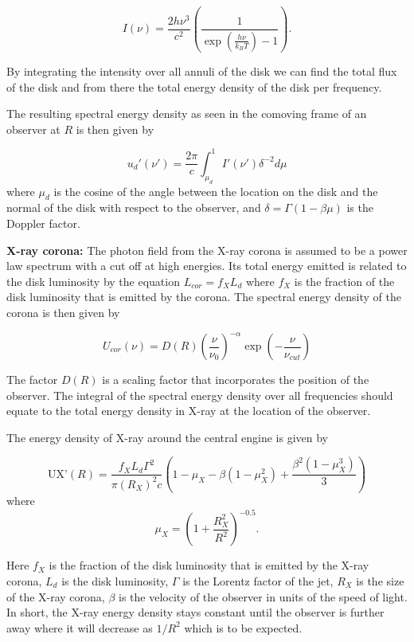 \begin{equation}
    \label{eq:BB}
    I(\nu) = \frac{2 h \nu^3}{c^2} \left(\frac{1}{\exp\left(\frac{h \nu}{k_B T}\right) - 1}\right).
\end{equation}

By integrating the intensity over all annuli of the disk we can find the total flux of the disk and from there the total energy density of the disk per frequency.

The resulting spectral energy density as seen in the comoving frame of an observer at $R$ is then given by

\begin{equation}
    u_d'(\nu') = \frac{2\pi}{c} \int_{\mu_d}^1 I'(\nu')\delta^{-2} d\mu
\end{equation}
where $\mu_d$ is the cosine of the angle between the location on the disk and the normal of the disk with respect to the observer, and $\delta = \Gamma(1-\beta \mu)$ is the Doppler factor. 

\textbf{X-ray corona:} The photon field from the X-ray corona is assumed to be a power law spectrum with a cut off at high energies. Its total energy emitted is related to the disk luminosity 
by the equation $L_{cor} = f_X L_d$ where $f_X$ is the fraction of the disk luminosity that is emitted by the corona. The spectral energy density of the corona is then given by 

\begin{equation}
    U_{cor}(\nu) = D(R)\left(\frac{\nu}{\nu_0}\right)^{-\alpha} \exp\left(-\frac{\nu}{\nu_{cut}}\right)
\end{equation}

The factor $D(R)$ is a scaling factor that incorporates the position of the observer. The integral of the spectral energy density over all frequencies should equate to the total energy density in X-ray at the location of the observer.

The energy density of X-ray around the central engine is given by

\begin{equation}
    \text{UX'}(R) = \frac{f_{X} L_{d} \Gamma^2}{\pi (R_{X})^2 c} \left(1 - \mu_{X} - \beta(1 - \mu_{X}^2) + \frac{\beta^2 (1 - \mu_{X}^3)}{3}\right)
\end{equation}
where
\[
\mu_{X} = \left(1 + \frac{R_{X}^2}{R^2}\right)^{-0.5}.
\]

Here $f_{X}$ is the fraction of the disk luminosity that is emitted by the X-ray corona, $L_{d}$ is the disk luminosity, $\Gamma$ is the Lorentz factor of the jet, $R_{X}$ is the size of the X-ray corona, $\beta$ is the velocity of the observer in units of the speed of light.
In short, the X-ray energy density stays constant until the observer is further away where it will decrease as $1/R^2$ which is to be expected.

